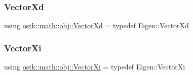 \mbox{\label{namespaceostk_1_1math_1_1obj_a84bdc62967e939556fb94869024693ff}} 
\subsubsection{\texorpdfstring{Vector\+Xd}{VectorXd}}
{\footnotesize\ttfamily using \hyperlink{namespaceostk_1_1math_1_1obj_a84bdc62967e939556fb94869024693ff}{ostk\+::math\+::obj\+::\+Vector\+Xd} = typedef Eigen\+::\+Vector\+Xd}

\mbox{\label{namespaceostk_1_1math_1_1obj_a69128b2659fb8f6ff4f927c6e8b87341}} 
\subsubsection{\texorpdfstring{Vector\+Xi}{VectorXi}}
{\footnotesize\ttfamily using \hyperlink{namespaceostk_1_1math_1_1obj_a69128b2659fb8f6ff4f927c6e8b87341}{ostk\+::math\+::obj\+::\+Vector\+Xi} = typedef Eigen\+::\+Vector\+Xi}

